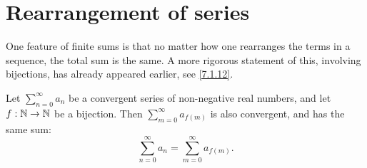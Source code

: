 \section{Rearrangement of series}\label{sec:7.4}

\begin{note}
  One feature of finite sums is that no matter how one rearranges the terms in a sequence, the total sum is the same.
  A more rigorous statement of this, involving bijections, has already appeared earlier, see \cref{7.1.12}.
\end{note}

\begin{prop}\label{7.4.1}
  Let \(\sum_{n = 0}^\infty a_n\) be a convergent series of non-negative real numbers, and let \(f : \mathbb{N} \to \mathbb{N}\) be a bijection.
  Then \(\sum_{m = 0}^\infty a_{f(m)}\) is also convergent, and has the same sum:
  \[
    \sum_{n = 0}^\infty a_n = \sum_{m = 0}^\infty a_{f(m)}.
  \]
\end{prop}

